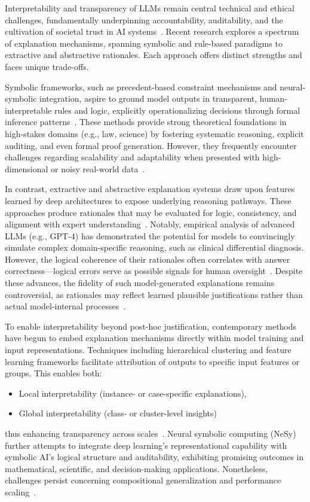 \documentclass[11pt]{article}
\begin{document}
Interpretability and transparency of LLMs remain central technical and ethical challenges, fundamentally underpinning accountability, auditability, and the cultivation of societal trust in AI systems~\cite{1,2,3,10,14,18,19,35,36,41,43,45,46,49,52,73,83,84,85}. Recent research explores a spectrum of explanation mechanisms, spanning symbolic and rule-based paradigms to extractive and abstractive rationales. Each approach offers distinct strengths and faces unique trade-offs.

Symbolic frameworks, such as precedent-based constraint mechanisms and neural-symbolic integration, aspire to ground model outputs in transparent, human-interpretable rules and logic, explicitly operationalizing decisions through formal inference patterns~\cite{14,18,19,45,73}. These methods provide strong theoretical foundations in high-stakes domains (e.g., law, science) by fostering systematic reasoning, explicit auditing, and even formal proof generation. However, they frequently encounter challenges regarding scalability and adaptability when presented with high-dimensional or noisy real-world data~\cite{14,18,41,46,83}.

In contrast, extractive and abstractive explanation systems draw upon features learned by deep architectures to expose underlying reasoning pathways. These approaches produce rationales that may be evaluated for logic, consistency, and alignment with expert understanding~\cite{1,3,10,35,41,45,49,85}. Notably, empirical analysis of advanced LLMs (e.g., GPT-4) has demonstrated the potential for models to convincingly simulate complex domain-specific reasoning, such as clinical differential diagnosis. However, the logical coherence of their rationales often correlates with answer correctness—logical errors serve as possible signals for human oversight~\cite{10,41}. Despite these advances, the fidelity of such model-generated explanations remains controversial, as rationales may reflect learned plausible justifications rather than actual model-internal processes~\cite{3,43,84}.

To enable interpretability beyond post-hoc justification, contemporary methods have begun to embed explanation mechanisms directly within model training and input representations. Techniques including hierarchical clustering and feature learning frameworks facilitate attribution of outputs to specific input features or groups. This enables both:
\begin{itemize}
    \item Local interpretability (instance- or case-specific explanations),
    \item Global interpretability (class- or cluster-level insights)
\end{itemize}
thus enhancing transparency across scales~\cite{36,52,83}. Neural symbolic computing (NeSy) further attempts to integrate deep learning’s representational capability with symbolic AI’s logical structure and auditability, exhibiting promising outcomes in mathematical, scientific, and decision-making applications. Nonetheless, challenges persist concerning compositional generalization and performance scaling~\cite{19,35,73,84}.
\end{document}
